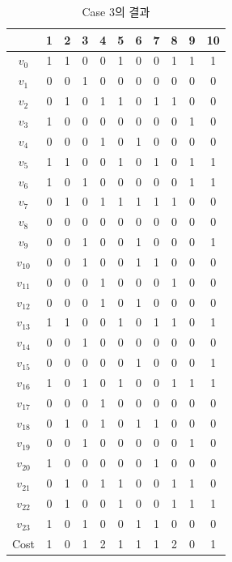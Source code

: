 \documentclass[12pt,a4paper]{article}
\begin{document}
    \begin{table}[htb!]
    \centering
    \begin{tabular}{c c c c c c c c c c c}
        & 1 & 2 & 3 & 4 & 5 & 6 & 7 & 8 & 9 & 10 \\
        \hline
        $v_0$ & 1 & 1 & 0 & 0 & 1 & 0 & 0 & 1 & 1 & 1 \\
        $v_1$ & 0 & 0 & 1 & 0 & 0 & 0 & 0 & 0 & 0 & 0 \\
        $v_2$ & 0 & 1 & 0 & 1 & 1 & 0 & 1 & 1 & 0 & 0 \\
        $v_3$ & 1 & 0 & 0 & 0 & 0 & 0 & 0 & 0 & 1 & 0 \\
        $v_4$ & 0 & 0 & 0 & 1 & 0 & 1 & 0 & 0 & 0 & 0 \\
        $v_5$ & 1 & 1 & 0 & 0 & 1 & 0 & 1 & 0 & 1 & 1 \\
        $v_6$ & 1 & 0 & 1 & 0 & 0 & 0 & 0 & 0 & 1 & 1 \\
        $v_7$ & 0 & 1 & 0 & 1 & 1 & 1 & 1 & 1 & 0 & 0 \\
        $v_8$ & 0 & 0 & 0 & 0 & 0 & 0 & 0 & 0 & 0 & 0 \\
        $v_9$ & 0 & 0 & 1 & 0 & 0 & 1 & 0 & 0 & 0 & 1 \\
        $v_{10}$ & 0 & 0 & 1 & 0 & 0 & 1 & 1 & 0 & 0 & 0 \\
        $v_{11}$ & 0 & 0 & 0 & 1 & 0 & 0 & 0 & 1 & 0 & 0 \\
        $v_{12}$ & 0 & 0 & 0 & 1 & 0 & 1 & 0 & 0 & 0 & 0 \\
        $v_{13}$ & 1 & 1 & 0 & 0 & 1 & 0 & 1 & 1 & 0 & 1 \\
        $v_{14}$ & 0 & 0 & 1 & 0 & 0 & 0 & 0 & 0 & 0 & 0 \\
        $v_{15}$ & 0 & 0 & 0 & 0 & 0 & 1 & 0 & 0 & 0 & 1 \\
        $v_{16}$ & 1 & 0 & 1 & 0 & 1 & 0 & 0 & 1 & 1 & 1 \\
        $v_{17}$ & 0 & 0 & 0 & 1 & 0 & 0 & 0 & 0 & 0 & 0 \\
        $v_{18}$ & 0 & 1 & 0 & 1 & 0 & 1 & 1 & 0 & 0 & 0 \\
        $v_{19}$ & 0 & 0 & 1 & 0 & 0 & 0 & 0 & 0 & 1 & 0 \\
        $v_{20}$ & 1 & 0 & 0 & 0 & 0 & 0 & 1 & 0 & 0 & 0 \\
        $v_{21}$ & 0 & 1 & 0 & 1 & 1 & 0 & 0 & 1 & 1 & 0 \\
        $v_{22}$ & 0 & 1 & 0 & 0 & 1 & 0 & 0 & 1 & 1 & 1 \\
        $v_{23}$ & 1 & 0 & 1 & 0 & 0 & 1 & 1 & 0 & 0 & 0 \\
        Cost & 1 & 0 & 1 & 2 & 1 & 1 & 1 & 2 & 0 & 1 \\
    \end{tabular}
    \caption{Case 3의 결과}
    \label{tab:result3}
    \end{table}
\end{document}
